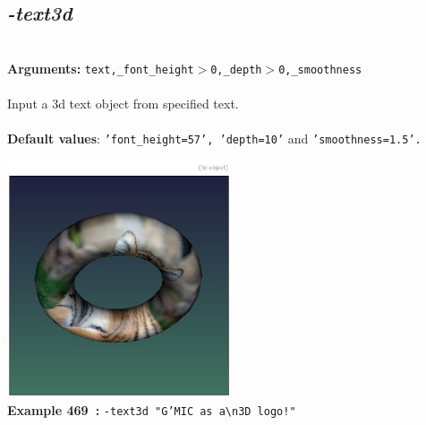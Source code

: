\documentclass[a4paper,11pt,twoside]{book}
\begin{document}
\subsection{\emph{-text3d} }\vspace*{-0.5em}
~\\\textbf{Arguments: } 
{\small \texttt{text,\_font\_height$>$0,\_depth$>$0,\_smoothness}}\\~\\
Input a 3d text object from specified text.
~\\~\\\textbf{Default values}: {\small \texttt{'font\_height=57', 'depth=10'} and \texttt{'smoothness=1.5'.}}
\begin{center}\includegraphics[keepaspectratio=true,height=7cm,width=\textwidth]{img/gmic_def469.jpg}\\
{\footnotesize \textbf{Example 469~:} \texttt{-text3d "G'MIC as a\textbackslash n3D logo!"}}
\end{center}
\end{document}
